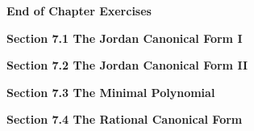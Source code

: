 \documentclass[11pt,largemargins]{homework}
\begin{document}
\maketitle

\textbf{\large{End of Chapter Exercises}}

\textbf{\large{Section 7.1} The Jordan Canonical Form I}

\question

\question

\question

\question

\question

\question

\question

\question

\question

\question

\textbf{\large{Section 7.2} The Jordan Canonical Form II}
\setcounter{questionCounter}{0}
\question

\question

\question

\question

\question

\question

\question

\question

\question

\question

\textbf{\large{Section 7.3} The Minimal Polynomial}
\setcounter{questionCounter}{0}
\question

\question

\question

\question

\question

\question

\question

\question

\question

\question

\textbf{\large{Section 7.4} The Rational Canonical Form}
\setcounter{questionCounter}{0}
\question

\question

\question

\question

\question

\question

\question

\question

\question

\question
\end{document}
